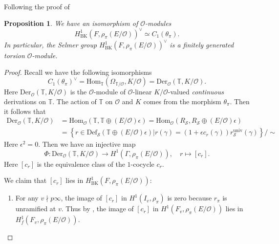 \documentclass[12pt,oneside,reqno]{amsart}
\theoremstyle{plain}
\newtheorem{proposition}[theorem]{Proposition}
\begin{document}
	
	Following the proof of \cite[Proposition 3.4]{HidaTilouine2020}
	\begin{proposition}\label{Differential module vs Bloch-Kato Selmer group}
		We have an isomorphism of $\mathcal{O}$-modules
		\[
		H^1_\mathrm{BK}(F,\rho_\pi(E/\mathcal{O}))^\vee
		\simeq
		C_1(\theta_\pi).
		\]
		In particular, the Selmer group $H^1_\mathrm{BK}(F,\rho_\pi(E/\mathcal{O}))^\vee$ is a finitely generated torsion $\mathcal{O}$-module.
	\end{proposition}
	\begin{proof}
		Recall we have the following isomorphisms
		\[
		C_1(\theta_\pi)^\vee
		=
		\mathrm{Hom}_{\mathbb{T}}(\Omega_{\mathbb{T}/\mathcal{O}},K/\mathcal{O})
		=
		\mathrm{Der}_\mathcal{O}(\mathbb{T},K/\mathcal{O}).
		\]
		Here $\mathrm{Der}_\mathcal{O}(\mathbb{T},K/\mathcal{O})$ is the $\mathcal{O}$-module of $\mathcal{O}$-linear $K/\mathcal{O}$-valued \emph{continuous} derivations on $\mathbb{T}$. The action of $\mathbb{T}$ on $\mathcal{O}$ and $K$ comes from the morphism $\theta_\pi$. Then it follows that
		\begin{align*}
			\mathrm{Der}_\mathcal{O}(\mathbb{T},K/\mathcal{O})
			&
			=
			\mathrm{Hom}_\mathcal{O}(\mathbb{T},\mathbb{T}\oplus(E/\mathcal{O})\epsilon)
			=
			\mathrm{Hom}_\mathcal{O}(R_\mathcal{S},R_\mathcal{S}\oplus(E/\mathcal{O})\epsilon)
			\\
			&
			=
			\left\{
			r\in\mathrm{Def}_\mathcal{S}(\mathbb{T}\oplus(E/\mathcal{O})\epsilon)
			|
			r(\gamma)
			=
			(1+\epsilon c_r(\gamma))r_{\mathcal{S}}^\mathrm{univ}(\gamma)
			\right\}/\sim
		\end{align*}
		Here $\epsilon^2=0$.
		Then we have an injective map
		\[
		\Phi\colon
		\mathrm{Der}_\mathcal{O}(\mathbb{T},K/\mathcal{O})
		\to
		H^1(\Gamma,\rho_\pi(E/\mathcal{O})),
		\quad
		r\mapsto
		[c_r].
		\]
		Here $[c_r]$ is the equivalence class of the $1$-cocycle $c_r$.
		
		
		We claim that $[c_r]$ lies in $H^1_\mathrm{BK}(F,\rho_\pi(E/\mathcal{O}))$:
		\begin{enumerate}
			\item 
			For any $v\nmid p\infty$, the image of $[c_r]$ in $H^1(I_v,\rho_\pi)$ is zero because $r_\pi$ is unramified at $v$. Thus by \cite[Lemma 1.3.5(iv)]{Rubin2000}, the image of $[c_r]$ in $H^1(F_v,\rho_\pi(E/\mathcal{O}))$ lies in $H^1_f(F_v,\rho_\pi(E/\mathcal{O}))$.
			
			
			

\end{enumerate}
\end{proof}
\end{document}
